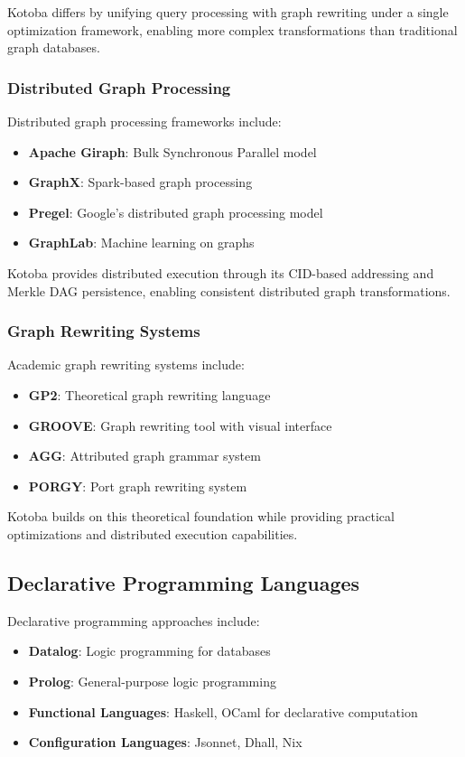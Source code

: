 \documentclass[11pt,a4paper]{article}
\begin{document}
Kotoba differs by unifying query processing with graph rewriting under a single optimization framework, enabling more complex transformations than traditional graph databases.

\subsubsection{Distributed Graph Processing}
\label{subsubsec:distributed_graph}

Distributed graph processing frameworks include:
\begin{itemize}
\item \textbf{Apache Giraph}: Bulk Synchronous Parallel model
\item \textbf{GraphX}: Spark-based graph processing
\item \textbf{Pregel}: Google's distributed graph processing model
\item \textbf{GraphLab}: Machine learning on graphs
\end{itemize}

Kotoba provides distributed execution through its CID-based addressing and Merkle DAG persistence, enabling consistent distributed graph transformations.

\subsubsection{Graph Rewriting Systems}
\label{subsubsec:rewriting_systems}

Academic graph rewriting systems include:
\begin{itemize}
\item \textbf{GP2}: Theoretical graph rewriting language
\item \textbf{GROOVE}: Graph rewriting tool with visual interface
\item \textbf{AGG}: Attributed graph grammar system
\item \textbf{PORGY}: Port graph rewriting system
\end{itemize}

Kotoba builds on this theoretical foundation while providing practical optimizations and distributed execution capabilities.

\subsection{Declarative Programming Languages}
\label{subsec:declarative}

Declarative programming approaches include:
\begin{itemize}
\item \textbf{Datalog}: Logic programming for databases
\item \textbf{Prolog}: General-purpose logic programming
\item \textbf{Functional Languages}: Haskell, OCaml for declarative computation
\item \textbf{Configuration Languages}: Jsonnet, Dhall, Nix
\end{itemize}
\end{document}
